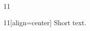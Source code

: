 \documentclass[paper=A4]{ropas-poster}
\begin{document}
\begin{postergrid}{1}{1}
\begin{posterblock}{1}{1}[align=center]
Short text.
\end{posterblock}
\end{postergrid}
\end{document}
